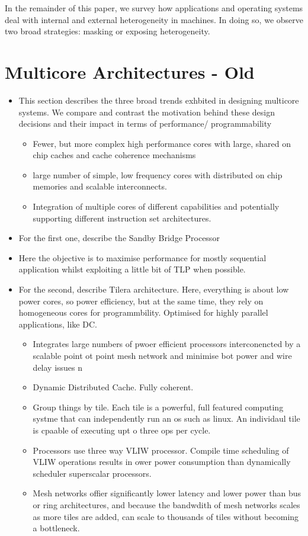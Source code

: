 In the remainder of this paper, we survey how applications and operating
systems deal with internal and external heterogeneity in machines. 
In doing so, we observe two broad strategies: masking or exposing heterogeneity. 


\section{Multicore Architectures - Old}
\begin{itemize}
\item This section describes the three broad trends exhbited in designing
multicore systems. We compare and contrast the motivation
behind these design decisions and their impact in terms of performance/
programmability  
\begin{itemize}
\item Fewer, but more complex high performance cores with large,
shared on chip caches and cache coherence mechanisms
\item large number of simple, low frequency cores with distributed on chip
memories and scalable interconnects.
\item Integration of multiple cores of different capabilities and 
potentially supporting different instruction set architectures. 
\end{itemize}
\item For the first one, describe the Sandby Bridge Processor
\item Here the objective is to maximise performance for mostly sequential application
whilst exploiting a little bit of TLP when possible. 
\item For the second, describe Tilera architecture. Here, everything is about
low power cores, so power efficiency, but at the same time, they rely on 
homogeneous cores for programmbility. Optimised for highly parallel
applications, like DC. 
\begin{itemize}
\item Integrates large numbers of pwoer efficient processors interconencted by a scalable 
point ot point mesh network and minimise bot power and wire  delay issues
n\item Dynamic Distributed Cache. Fully coherent. 
\item Group things by tile. Each tile is a powerful, full featured computing systme 
that can independently run an os such as linux. 
An individaul tile is cpaable of executing upt o three ops per cycle. 
\item Processors use three way VLIW processor. Compile time scheduling of VLIW operations results in 
ower power consumption than dynamically scheduler superscalar processors. 
\item Mesh networks offier significantly lower latency and lower power than bus
or ring architectures, and because the bandwdith of mesh networks
scales as more tiles are added, can scale to thousands of tiles without 
becoming a bottleneck.


\end{itemize}
\end{itemize}
